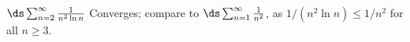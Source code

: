 {$\ds \sum_{n=2}^\infty \frac{1}{n^2\ln n}$
}
{Converges; compare to $\ds \sum_{n=1}^\infty \frac 1{n^2}$, as $1/(n^2\ln n) \leq 1/n^2$ for all $n\geq 3$.
}